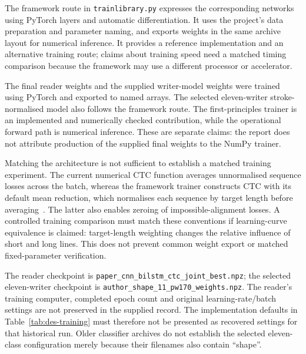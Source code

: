 The framework route in \texttt{trainlibrary.py} expresses the corresponding networks using PyTorch layers and automatic differentiation. It uses the project's data preparation and parameter naming, and exports weights in the same archive layout for numerical inference. It provides a reference implementation and an alternative training route; claims about training speed need a matched timing comparison because the framework may use a different processor or accelerator.

The final reader weights and the supplied writer-model weights were trained using PyTorch and exported to named arrays. The selected eleven-writer stroke-normalised model also follows the framework route. The first-principles trainer is an implemented and numerically checked contribution, while the operational forward path is numerical inference. These are separate claims: the report does not attribute production of the supplied final weights to the NumPy trainer.

Matching the architecture is not sufficient to establish a matched training experiment. The current numerical CTC function averages unnormalised sequence losses across the batch, whereas the framework trainer constructs CTC with its default mean reduction, which normalises each sequence by target length before averaging~\cite[CTCLoss, ``Parameters]{pytorchctc}. The latter also enables zeroing of impossible-alignment losses. A controlled training comparison must match these conventions if learning-curve equivalence is claimed: target-length weighting changes the relative influence of short and long lines. This does not prevent common weight export or matched fixed-parameter verification.

The reader checkpoint is \texttt{paper\_cnn\_bilstm\_ctc\_joint\_best.npz}; the selected eleven-writer checkpoint is \texttt{author\_shape\_11\_pw170\_weights.npz}. The reader's training computer, completed epoch count and original learning-rate/batch settings are not preserved in the supplied record. The implementation defaults in Table~\ref{tab:des-training} must therefore not be presented as recovered settings for that historical run. Older classifier archives do not establish the selected eleven-class configuration merely because their filenames also contain ``shape''.

